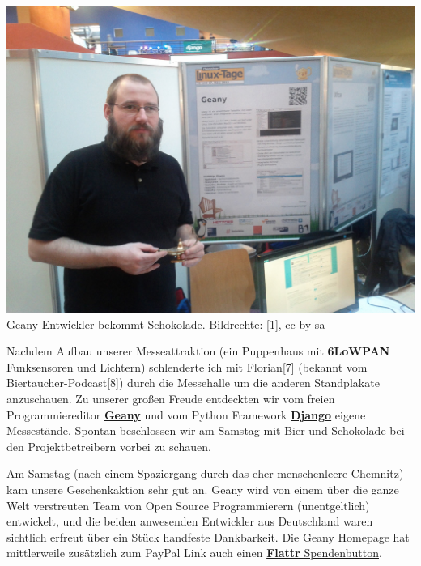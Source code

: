 \begin{center}
\includegraphics[width=\linewidth]{chemnitz_geany1.jpg}
\footnotesize{Geany Entwickler bekommt Schokolade. Bildrechte: [1], cc-by-sa}
\end{center}

Nachdem Aufbau unserer Messeattraktion (ein Puppenhaus mit \textbf{6LoWPAN} Funksensoren und Lichtern) schlenderte ich mit Florian[7] (bekannt vom Biertaucher-Podcast[8]) durch die Messehalle um die anderen Standplakate anzuschauen. Zu unserer großen Freude entdeckten wir vom freien Programmiereditor \href{http://geany.org/}{\textbf{Geany}} und vom Python Framework \href{https://www.djangoproject.com/}{\textbf{Django}} eigene Messestände. Spontan beschlossen wir am Samstag mit Bier und Schokolade bei den Projektbetreibern vorbei zu schauen.

Am Samstag (nach einem Spaziergang durch das eher menschenleere Chemnitz) kam unsere Geschenkaktion sehr gut an. Geany wird von einem über die ganze Welt verstreuten Team von  Open Source Programmierern (unentgeltlich) entwickelt, und die beiden anwesenden Entwickler aus Deutschland waren sichtlich erfreut über ein Stück handfeste Dankbarkeit. Die Geany Homepage hat mittlerweile zusätzlich zum PayPal Link auch einen  \href{http://flattr.com/thing/1151425/Geany}{\textbf{Flattr} Spendenbutton}. 

